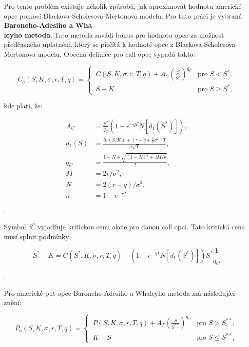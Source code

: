 \documentclass[male,czech,api_bc]{kitheses}
\begin{document}
  Pro tento problém existuje několik způsobů, jak aproximovat hodnotu americké opce pomocí Blackova-Scholesova-Mertonova modelu. Pro tuto práci je vybraná \textbf{Baroneho-Adesiho a Wha--\\leyho metoda}. Tato metoda zavádí bonus pro hodnotu opce za možnost předčasného uplatnění, který se přičítá k hodnotě opce z Blackova-Scholesova-Mertonova modelu. Obecná definice pro call opce vypadá takto:

  \begin{equation}
    C_a(S, K, \sigma, r, T, q) = 
    \begin{cases}
      \ C(S, K, \sigma, r, T, q) + A_C\left(\frac{S}{S^*}\right)^{q_C} & \text{pro } S < S^*, \\
      \ S - K & \text{pro } S \ge S^*,
    \end{cases}
  \end{equation}

  kde platí, že:

  \begin{align}
    \label{BAW_params_start}
    A_C &= \frac{S^*}{q_C} (1 - e^{-qT} N[d_1 (S^*)]), \\
    d_1(S) &= \frac{ln(S / K) + (r - q + \frac{1}{2} \sigma^2)T}{\sigma \sqrt{T}}, \\
    q_C &= \frac{1 - N + \sqrt{(1 - N)^2 + 4M / \kappa}}{2}, \\
    M &= 2r / \sigma^2, \\
    N &= 2(r - q) / \sigma^2, \\
    \label{BAW_params_end}
    \kappa &= 1 - e^{-rT}
  \end{align}

  \parencites[kapitola~3.1]{Haug2007}.

  Symbol $S^*$ vyjadřuje kritickou cenu akcie pro danou call opci. Tato kritická cena musí splnit podmínky:

  \begin{equation}
    S^* - K = C(S^*, K, \sigma, r, T, q) + (1 - e^{-qT} N[d_1(S^*)])S^*\frac{1}{q_C} \label{eq:s_star_stock_price}
  \end{equation}

  \parencites[kapitola~3.1]{Haug2007}.

  Pro americké put opce Baroneho-Adesiho a Whaleyho metoda má následující znění:

  \begin{equation}
    P_a(S, K, \sigma, r, T, q) = 
    \begin{cases}
      \ P(S, K, \sigma, r, T, q) + A_P\left(\frac{S}{S^{**}}\right)^{q_P} & \text{pro } S > S^{**}, \\
      \ K - S & \text{pro } S \le S^{**},
    \end{cases}
  \end{equation}
\end{document}
